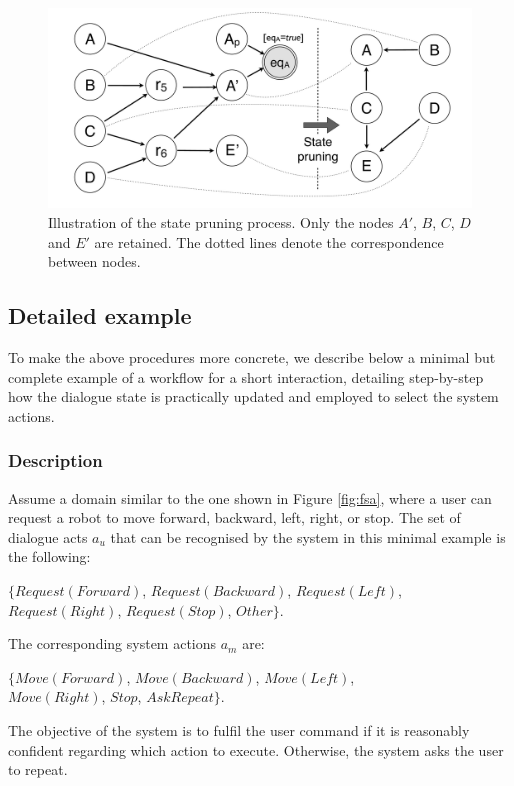 \begin{figure}[h]
\centering
\includegraphics[scale=0.21]{imgs/pruning.pdf}
\caption{Illustration of the state pruning process. Only the nodes $A'$, $B$, $C$, $D$ and $E'$ are retained. The dotted lines denote the correspondence between nodes.}
\label{fig:pruning}
\end{figure}


\subsection{Detailed example}
\label{sec:detailedexample}

To make the above procedures more concrete, we describe below a minimal but complete example of a workflow for a short interaction, detailing step-by-step how the dialogue state is practically updated and employed to select the system actions. 

\subsubsection*{Description}

Assume a domain similar to the one shown in Figure \ref{fig:fsa}, where a user can request a robot to move forward, backward, left, right, or stop.  The set of dialogue acts $a_u$ that can be recognised by the system in this minimal example is the following: 
\begin{center}
$\{\mathit{Request(Forward)}$, $\mathit{Request(Backward)}$, $\mathit{Request(Left)}$, \\ $\mathit{Request(Right)}$, $\mathit{Request(Stop)}$, $\mathit{Other}\}$. \\
\end{center}
The corresponding system actions $a_m$ are: 
\begin{center}
$\{\mathit{Move(Forward)}$, $\mathit{Move(Backward)}$, $\mathit{Move(Left)}$, \\ $\mathit{Move(Right)}$, $\mathit{Stop}$, $\mathit{AskRepeat}\}$. 
\end{center}
The objective of the system is to fulfil the user command if it is reasonably confident regarding which action to execute.  Otherwise, the system asks the user to repeat. 

